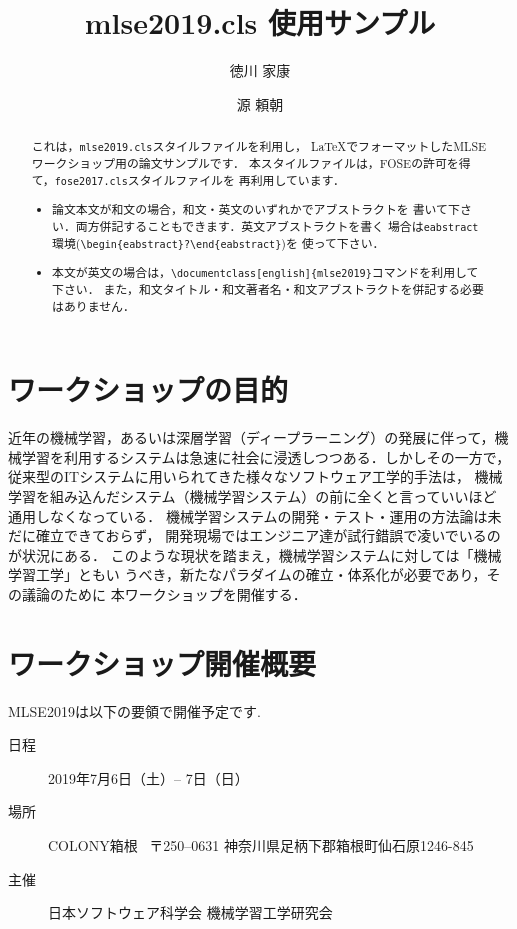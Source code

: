 \documentclass{mlse2019}           %
\title{mlse2019.cls 使用サンプル}
\author{徳川 家康}{Ieyasu Tokugawa, 江戸幕府}
\author{源 頼朝}{Minamotono Yoritomo, 鎌倉幕府}
\begin{document}
\maketitle


\begin{abstract}
これは，{\tt mlse2019.cls}スタイルファイルを利用し，
\LaTeX でフォーマットしたMLSEワークショップ用の論文サンプルです．
本スタイルファイルは，FOSEの許可を得て，{\tt fose2017.cls}スタイルファイルを
再利用しています．
\begin{itemize}
\item 論文本文が和文の場合，和文・英文のいずれかでアブストラクトを
書いて下さい．両方併記することもできます．英文アブストラクトを書く
場合は{\tt eabstract}環境(\verb|\begin{eabstract}?\end{eabstract}|)を
使って下さい．
\item 本文が英文の場合は，{\verb|\documentclass[english]{mlse2019}|}コマンドを利用して下さい．
また，和文タイトル・和文著者名・和文アブストラクトを併記する必要はありません．
\end{itemize}
\end{abstract}

\section{ワークショップの目的}

近年の機械学習，あるいは深層学習（ディープラーニング）の発展に伴って，機
械学習を利用するシステムは急速に社会に浸透しつつある．しかしその一方で，
従来型のITシステムに用いられてきた様々なソフトウェア工学的手法は，
機械学習を組み込んだシステム（機械学習システム）の前に全くと言っていいほど
通用しなくなっている．
機械学習システムの開発・テスト・運用の方法論は未だに確立できておらず，
開発現場ではエンジニア達が試行錯誤で凌いでいるのが状況にある．
このような現状を踏まえ，機械学習システムに対しては「機械学習工学」ともい
うべき，新たなパラダイムの確立・体系化が必要であり，その議論のために
本ワークショップを開催する．



\section{ワークショップ開催概要}
MLSE2019\cite{mlse2019}は以下の要領で開催予定です.
\begin{description}
\item[日程] 2019年7月6日（土）-- 7日（日）
\item[場所] COLONY箱根\
{\footnotesize
   〒250--0631 神奈川県足柄下郡箱根町仙石原1246-845
}
\item[主催] 日本ソフトウェア科学会 機械学習工学研究会
\end{description}
\end{document}
